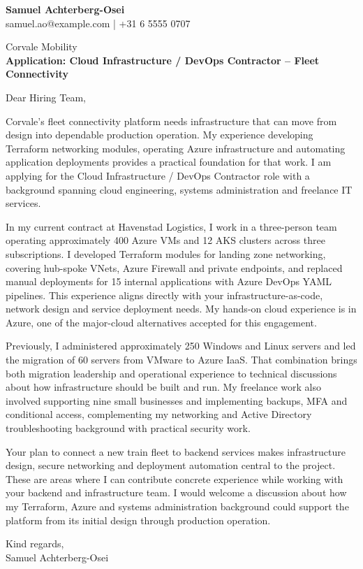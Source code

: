 \documentclass[11pt,a4paper]{article}
\begin{document}
{\large\bfseries\color{primarycolor} Samuel Achterberg-Osei}\\
samuel.ao@example.com | +31 6 5555 0707

Corvale Mobility\\
\textbf{Application: Cloud Infrastructure / DevOps Contractor -- Fleet Connectivity}

Dear Hiring Team,

Corvale's fleet connectivity platform needs infrastructure that can move from design into dependable production operation. My experience developing Terraform networking modules, operating Azure infrastructure and automating application deployments provides a practical foundation for that work. I am applying for the Cloud Infrastructure / DevOps Contractor role with a background spanning cloud engineering, systems administration and freelance IT services.

In my current contract at Havenstad Logistics, I work in a three-person team operating approximately 400 Azure VMs and 12 AKS clusters across three subscriptions. I developed Terraform modules for landing zone networking, covering hub-spoke VNets, Azure Firewall and private endpoints, and replaced manual deployments for 15 internal applications with Azure DevOps YAML pipelines. This experience aligns directly with your infrastructure-as-code, network design and service deployment needs. My hands-on cloud experience is in Azure, one of the major-cloud alternatives accepted for this engagement.

Previously, I administered approximately 250 Windows and Linux servers and led the migration of 60 servers from VMware to Azure IaaS. That combination brings both migration leadership and operational experience to technical discussions about how infrastructure should be built and run. My freelance work also involved supporting nine small businesses and implementing backups, MFA and conditional access, complementing my networking and Active Directory troubleshooting background with practical security work.

Your plan to connect a new train fleet to backend services makes infrastructure design, secure networking and deployment automation central to the project. These are areas where I can contribute concrete experience while working with your backend and infrastructure team. I would welcome a discussion about how my Terraform, Azure and systems administration background could support the platform from its initial design through production operation.

Kind regards,\\
Samuel Achterberg-Osei
\end{document}
